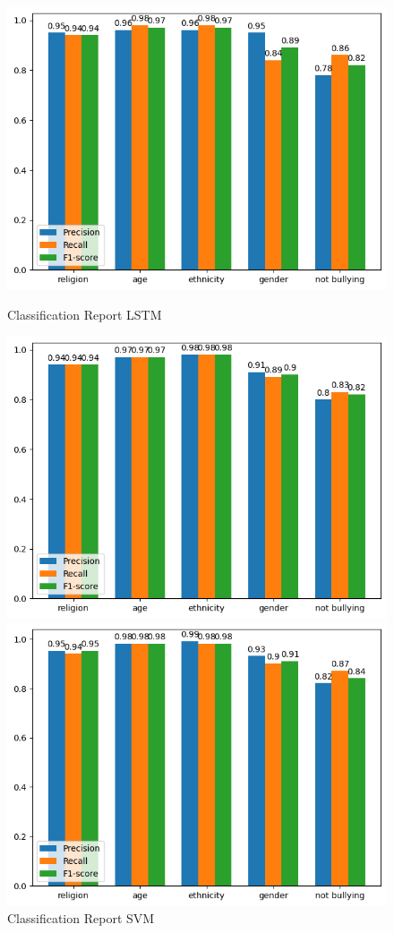 \documentclass[conference]{IEEEtran}
\begin{document}
\begin{figure}[!htb]
\centering
\parbox{0.65\columnwidth}{
\includegraphics[scale=0.37]{LSTM.png}
\caption{Classification Report LSTM}
\label{fig:cmp1}}
\parbox{0.65\columnwidth}{
\includegraphics[scale=0.37]{SVM.png}
\caption{Classification Report SVM}
\label{fig:cmp2}}
\parbox{0.65\columnwidth}{
\includegraphics[scale=0.37]{LR.png}
}
\end{figure}
\end{document}
